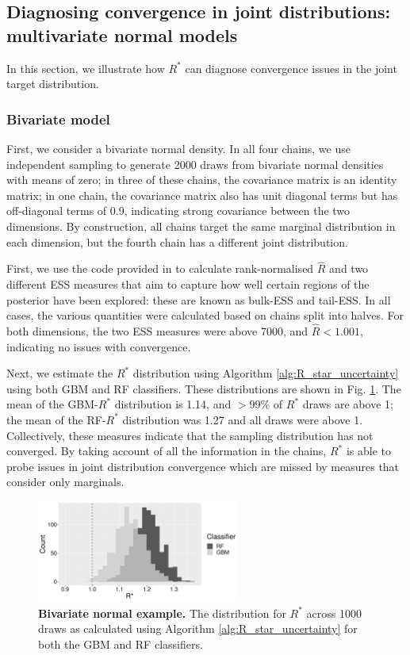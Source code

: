 \documentclass[ba]{imsart}
\numberwithin{equation}{section}
\theoremstyle{plain}
\begin{document}
\color{black}
\subsection{Diagnosing convergence in joint distributions: multivariate normal models}\label{sec:multivariate_normal}
In this section, we illustrate how $R^*$ can diagnose convergence issues in the joint target distribution.

\subsubsection{Bivariate model}\label{sec:multivariate_normal_bivariate}
First, we consider a bivariate normal density. In all four chains, we use independent sampling to generate 2000 draws from bivariate normal densities with means of zero; in three of these chains, the covariance matrix is an identity matrix; in one chain, the covariance matrix also has unit diagonal terms but has off-diagonal terms of 0.9, indicating strong covariance between the two dimensions. By construction, all chains target the same marginal distribution in each dimension, but the fourth chain has a different joint distribution.

First, we use the code provided in \cite{vehtari2019rank} to calculate rank-normalised $\widehat{R}$ and two different ESS measures that aim to capture how well certain regions of the posterior have been explored: these are known as bulk-ESS and tail-ESS. In all cases, the various quantities were calculated based on chains split into halves. For both dimensions, the two ESS measures were above 7000, and $\widehat{R}<1.001$, indicating no issues with convergence.

Next, we estimate the $R^*$ distribution using Algorithm \ref{alg:R_star_uncertainty} using both GBM and RF classifiers. These distributions are shown in Fig. \ref{fig:bivariate}. The mean of the GBM-$R^*$ distribution is 1.14, and $>$99\% of $R^*$ draws are above 1; the mean of the RF-$R^*$ distribution was 1.27 and all draws were above 1. Collectively, these measures indicate that the sampling distribution has not converged. By taking account of all the information in the chains, $R^*$ is able to probe issues in joint distribution convergence which are missed by measures that consider only marginals.

\begin{figure}[!htb]
	\centerline{\includegraphics[width=0.6\textwidth]{bivariate.pdf}}
	\caption{\textbf{Bivariate normal example.} The distribution for $R^*$ across 1000 draws as calculated using Algorithm \ref{alg:R_star_uncertainty} for both the GBM and RF classifiers.}
	\label{fig:bivariate}
\end{figure}
\end{document}
